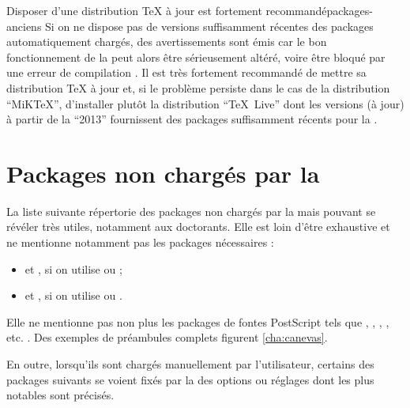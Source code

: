 \begin{dbremark}{Disposer d'une distribution \TeX{} à jour est fortement
    recommandé}{packages-anciens}
  Si on ne dispose pas de versions suffisamment récentes des packages
  automatiquement chargés, des avertissements sont émis car le bon
  fonctionnement de la \yatcl{} peut alors être sérieusement altéré, voire être
  bloqué par une erreur de compilation . Il
  est très fortement recommandé de mettre sa distribution \TeX{} à jour et, si
  le problème persiste dans le cas de la distribution \enquote{MiK\TeX{}},
  d'installer plutôt la distribution \enquote{\TeX~Live} dont les versions (à
  jour) à partir de la \enquote{2013} fournissent des packages suffisamment
  récents pour la \yatcl.
\end{dbremark}

\section{Packages non chargés par la \yatcl{}}

La liste suivante répertorie des packages non chargés par la \yatcl{} mais
pouvant se révéler très utiles, notamment aux doctorants.  Elle est loin d'être
exhaustive et ne mentionne notamment pas les packages nécessaires :
\begin{itemize}
\item {} et , si on utilise  ou
   ;
\item {} et , si on utilise 
  ou .
\end{itemize}
Elle ne mentionne pas non plus les packages de fontes PostScript tels que
, , , ,
etc. . Des exemples de préambules complets figurent
\vref{cha:canevas}.

En outre, lorsqu'ils sont chargés manuellement par l'utilisateur, certains des
packages suivants se voient fixés par la \yatcl{} des options ou réglages dont
les plus notables sont précisés.

